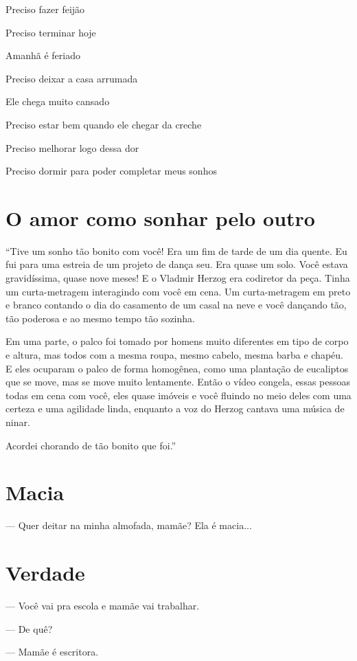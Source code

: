 Preciso fazer feijão

Preciso terminar hoje

Amanhã é feriado

Preciso deixar a casa arrumada

Ele chega muito cansado

Preciso estar bem quando ele chegar da creche

Preciso melhorar logo dessa dor

Preciso dormir para poder completar meus sonhos

\chapter{O amor como sonhar pelo outro}

``Tive um sonho tão bonito com você! Era um fim de tarde de um dia
quente. Eu fui para uma estreia de um projeto de dança seu. Era quase um
solo. Você estava gravidíssima, quase nove meses! E o Vladmir Herzog era
codiretor da peça. Tinha um curta-metragem interagindo com você em cena.
Um curta-metragem em preto e branco contando o dia do casamento de um
casal na neve e você dançando tão, tão poderosa e ao mesmo tempo tão
sozinha.

Em uma parte, o palco foi tomado por homens muito diferentes em tipo de
corpo e altura, mas todos com a mesma roupa, mesmo cabelo, mesma barba e
chapéu. E eles ocuparam o palco de forma homogênea, como uma plantação
de eucaliptos que se move, mas se move muito lentamente. Então o vídeo
congela, essas pessoas todas em cena com você, eles quase imóveis e você
fluindo no meio deles com uma certeza e uma agilidade linda, enquanto a
voz do Herzog cantava uma música de ninar.

Acordei chorando de tão bonito que foi.''

\chapter{Macia}\label{macia}


--- Quer deitar na minha almofada, mamãe? Ela é macia...

\chapter{Verdade}\label{verdade}

--- Você vai pra escola e mamãe vai trabalhar.

--- De quê?

--- Mamãe é escritora.

